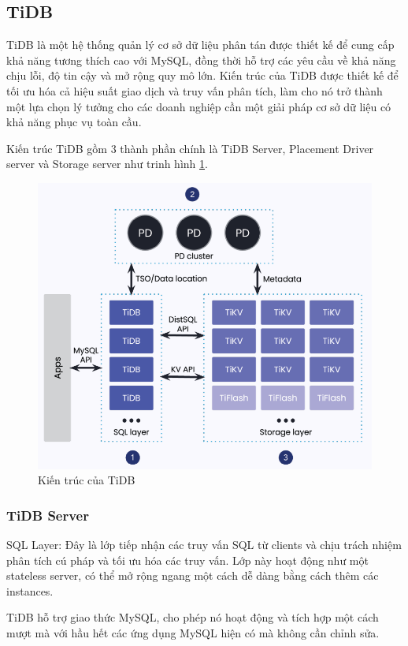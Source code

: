 \documentclass[50pt]{extarticle}
\begin{document}
\subsection{TiDB}

TiDB \cite{huang2020tidb} là một hệ thống quản lý cơ sở dữ liệu phân tán được thiết kế để cung cấp khả năng tương thích cao với MySQL, đồng thời hỗ trợ các yêu cầu về khả năng chịu lỗi, độ tin cậy và mở rộng quy mô lớn. Kiến trúc của TiDB được thiết kế để tối ưu hóa cả hiệu suất giao dịch và truy vấn phân tích, làm cho nó trở thành một lựa chọn lý tưởng cho các doanh nghiệp cần một giải pháp cơ sở dữ liệu có khả năng phục vụ toàn cầu.

Kiến trúc TiDB gồm 3 thành phần chính là TiDB Server, Placement Driver server và Storage server như trinh hình \ref{fig:TiDBArchiteture}.


\begin{figure}
    \centering
    \includegraphics[width=0.6\linewidth]{images/TiDBArchiteture.png}
    \caption{Kiến trúc của TiDB\protect\footnotemark}
    \label{fig:TiDBArchiteture}
\end{figure}




\subsubsection{TiDB Server}

SQL Layer: Đây là lớp tiếp nhận các truy vấn SQL từ clients và chịu trách nhiệm phân tích cú pháp và tối ưu hóa các truy vấn. Lớp này hoạt động như một stateless server, có thể mở rộng ngang một cách dễ dàng bằng cách thêm các instances.

TiDB hỗ trợ giao thức MySQL, cho phép nó hoạt động và tích hợp một cách mượt mà với hầu hết các ứng dụng MySQL hiện có mà không cần chỉnh sửa.
\end{document}
